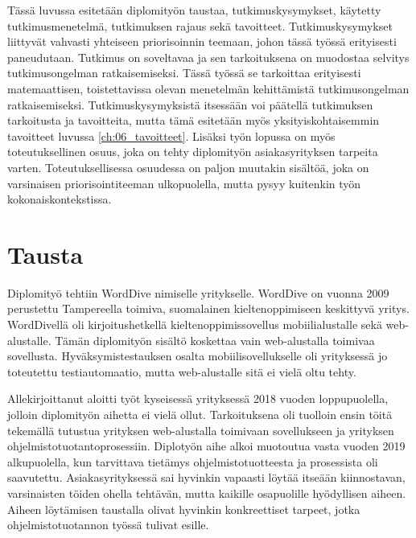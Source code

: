 Tässä luvussa esitetään diplomityön taustaa, tutkimuskysymykset, käytetty tutkimusmenetelmä, tutkimuksen rajaus sekä tavoitteet.
Tutkimuskysymykset liittyvät vahvasti yhteiseen priorisoinnin teemaan, johon tässä työssä erityisesti paneudutaan.
Tutkimus on soveltavaa ja sen tarkoituksena on muodostaa selvitys tutkimusongelman ratkaisemiseksi.
Tässä työssä se tarkoittaa erityisesti matemaattisen, toistettavissa olevan menetelmän kehittämistä tutkimusongelman ratkaisemiseksi.
Tutkimuskysymyksistä itsessään voi päätellä tutkimuksen tarkoitusta ja tavoitteita, mutta tämä esitetään myös yksityiskohtaisemmin tavoitteet luvussa \ref{ch:06_tavoitteet}.
Lisäksi työn lopussa on myös toteutuksellinen osuus, joka on tehty diplomityön asiakasyrityksen tarpeita varten.
Toteutuksellisessa osuudessa on paljon muutakin sisältöä, joka on varsinaisen priorisointiteeman ulkopuolella, mutta pysyy kuitenkin työn kokonaiskontekstissa.

\section{Tausta} \label{ch:06_tausta}

  Diplomityö tehtiin WordDive nimiselle yritykselle. WordDive on vuonna 2009 perustettu Tampereella toimiva, suomalainen kieltenoppimiseen keskittyvä yritys. WordDivellä oli kirjoitushetkellä kieltenoppimissovellus mobiilialustalle sekä web-alustalle.
  Tämän diplomityön sisältö koskettaa vain web-alustalla toimivaa sovellusta.
  Hyväksymistestauksen osalta mobiilisovellukselle oli yrityksessä jo toteutettu testiautomaatio, mutta web-alustalle sitä ei vielä oltu tehty.

  Allekirjoittanut aloitti työt kyseisessä yrityksessä 2018 vuoden loppupuolella, jolloin diplomityön aihetta ei vielä ollut.
  Tarkoituksena oli tuolloin ensin töitä tekemällä tutustua yrityksen web-alustalla toimivaan sovellukseen ja yrityksen ohjelmistotuotantoprosessiin.
  Diplotyön aihe alkoi muotoutua vasta vuoden 2019 alkupuolella, kun tarvittava tietämys ohjelmistotuotteesta ja prosessista oli saavutettu.
  Asiakasyrityksessä sai hyvinkin vapaasti löytää itseään kiinnostavan, varsinaisten töiden ohella tehtävän, mutta kaikille osapuolille hyödyllisen aiheen.
  Aiheen löytämisen taustalla olivat hyvinkin konkreettiset tarpeet, jotka ohjelmistotuotannon työssä tulivat esille.


